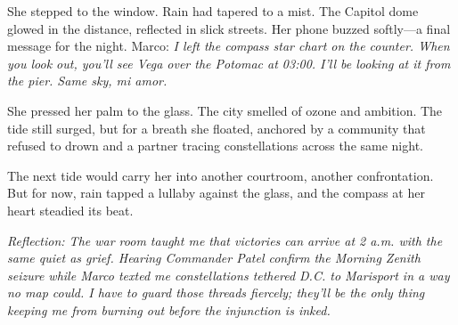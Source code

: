 She stepped to the window. Rain had tapered to a mist. The Capitol dome glowed in the distance, reflected in slick streets. Her phone buzzed softly—a final message for the night. Marco: \textit{I left the compass star chart on the counter. When you look out, you'll see Vega over the Potomac at 03:00. I'll be looking at it from the pier. Same sky, mi amor.}

She pressed her palm to the glass. The city smelled of ozone and ambition. The tide still surged, but for a breath she floated, anchored by a community that refused to drown and a partner tracing constellations across the same night.

The next tide would carry her into another courtroom, another confrontation. But for now, rain tapped a lullaby against the glass, and the compass at her heart steadied its beat.

\noindent\textit{Reflection: The war room taught me that victories can arrive at 2 a.m. with the same quiet as grief. Hearing Commander Patel confirm the \textit{Morning Zenith} seizure while Marco texted me constellations tethered D.C. to Marisport in a way no map could. I have to guard those threads fiercely; they'll be the only thing keeping me from burning out before the injunction is inked.}
